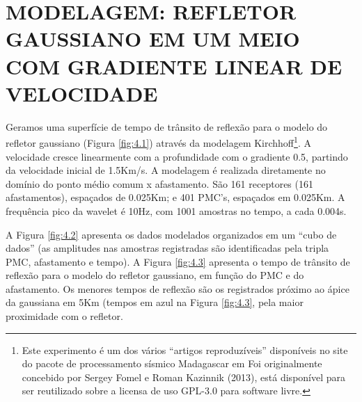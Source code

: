 %
% 
% 
% 
% 
% 
% 

\chapter{MODELAGEM: REFLETOR GAUSSIANO EM UM MEIO COM GRADIENTE LINEAR DE VELOCIDADE}
\label{cap:modelagem}

Geramos uma superfície de tempo de trânsito de reflexão para o modelo do refletor gaussiano (Figura \ref{fig:4.1})
através da modelagem Kirchhoff\footnote{Este experimento é um dos vários ``artigos reproduzíveis'' disponíveis no site
do pacote de processamento sísmico Madagascar em %
Foi originalmente concebido por Sergey Fomel e Roman Kazinnik (2013),
está disponível para ser reutilizado sobre a licensa de uso GPL-3.0 para software livre.}\cite{fomel1}.
A velocidade cresce linearmente com a profundidade com o gradiente 0.5, partindo da velocidade inicial de
1.5Km/s. A modelagem é realizada diretamente no domínio do ponto médio comum x afastamento. São 161 receptores (161 afastamentos),
espaçados de 0.025Km; e 401 PMC's, espaçados em 0.025Km. A frequência pico da wavelet é 10Hz, com 1001 amostras no tempo, a
cada 0.004s.

A Figura \ref{fig:4.2} apresenta os dados modelados organizados em um ``cubo de dados'' (as amplitudes nas amostras registradas
são identificadas pela tripla PMC, afastamento e tempo). A Figura \ref{fig:4.3} apresenta o tempo de trânsito de reflexão para o
modelo do refletor gaussiano, em função do PMC e do afastamento. Os menores tempos de reflexão são os registrados próximo ao 
ápice da gaussiana em 5Km (tempos em azul na Figura \ref{fig:4.3}, pela maior proximidade com o refletor.

